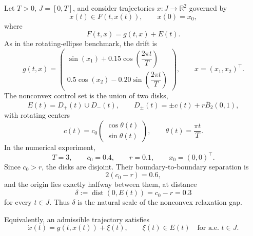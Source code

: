 \documentclass[11pt]{article}
\newcommand{\R}{\mathbb{R}}
\newcommand{\B}{\overline{B}_2(0,1)}
\newcommand{\dist}{\operatorname{dist}}
\begin{document}
Let $T>0$, $J=[0,T]$, and consider trajectories $x:J\to\R^2$ governed by
\begin{equation}
    \dot x(t)\in F(t,x(t)),\qquad x(0)=x_0,
    \label{eq:inclusion}
\end{equation}
where
\begin{equation}
    F(t,x)=g(t,x)+E(t).
    \label{eq:F}
\end{equation}
As in the rotating-ellipse benchmark, the drift is
\begin{equation}
    g(t,x)=
    \begin{pmatrix}
    \sin(x_1)+0.15\cos\!\left(\dfrac{2\pi t}{T}\right)\\[1mm]
    0.5\cos(x_2)-0.20\sin\!\left(\dfrac{2\pi t}{T}\right)
    \end{pmatrix},
    \qquad x=(x_1,x_2)^\top.
    \label{eq:drift}
\end{equation}
The nonconvex control set is the union of two disks,
\begin{equation}
    E(t)=D_+(t)\cup D_-(t),
    \qquad
    D_{\pm}(t)=\pm c(t)+r\B,
    \label{eq:E}
\end{equation}
with rotating centers
\begin{equation}
    c(t)=c_0
    \begin{pmatrix}
    \cos\theta(t)\\
    \sin\theta(t)
    \end{pmatrix},
    \qquad
    \theta(t)=\frac{\pi t}{T}.
    \label{eq:center}
\end{equation}
In the numerical experiment,
\begin{equation}
    T=3,
    \qquad c_0=0.4,
    \qquad r=0.1,
    \qquad x_0=(0,0)^\top.
    \label{eq:parameters}
\end{equation}
Since $c_0>r$, the disks are disjoint. Their boundary-to-boundary separation is
\begin{equation}
    2(c_0-r)=0.6,
\end{equation}
and the origin lies exactly halfway between them, at distance
\begin{equation}
    \delta:=\dist(0,E(t))=c_0-r=0.3
    \label{eq:gap}
\end{equation}
for every $t\in J$. Thus $\delta$ is the natural scale of the nonconvex relaxation gap.

Equivalently, an admissible trajectory satisfies
\begin{equation}
    \dot x(t)=g(t,x(t))+\xi(t),
    \qquad \xi(t)\in E(t)\quad\text{for a.e. }t\in J.
    \label{eq:selector_form}
\end{equation}
\end{document}
